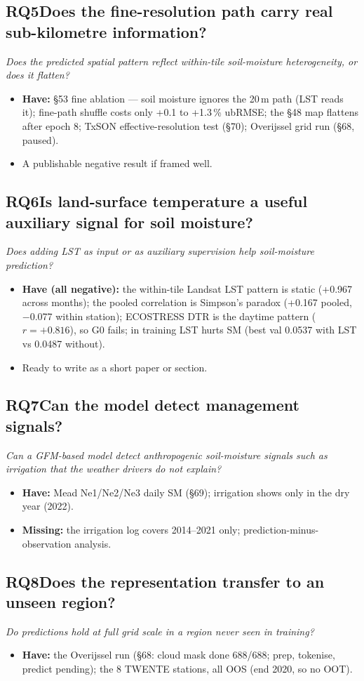 \documentclass[11pt,a4paper]{article}
\newcommand{\rqhead}[2]{\subsection*{#1\quad #2}}
\begin{document}
\rqhead{RQ5}{Does the fine-resolution path carry real sub-kilometre information?}
\textit{Does the predicted spatial pattern reflect within-tile soil-moisture heterogeneity, or does it flatten?}
\begin{itemize}
\item \textbf{Have:} \S53 fine ablation --- soil moisture ignores the 20\,m path (LST reads it);
      fine-path shuffle costs only +0.1 to +1.3\,\% ubRMSE; the \S48 map flattens after epoch 8;
      TxSON effective-resolution test (\S70); Overijssel grid run (\S68, paused).
\item A publishable negative result if framed well.
\end{itemize}

\rqhead{RQ6}{Is land-surface temperature a useful auxiliary signal for soil moisture?}
\textit{Does adding LST as input or as auxiliary supervision help soil-moisture prediction?}
\begin{itemize}
\item \textbf{Have (all negative):} the within-tile Landsat LST pattern is static (+0.967 across
      months); the pooled correlation is Simpson's paradox (+0.167 pooled, $-$0.077 within station);
      ECOSTRESS DTR is the daytime pattern ($r=+0.816$), so G0 fails; in training LST hurts SM
      (best val 0.0537 with LST vs 0.0487 without).
\item Ready to write as a short paper or section.
\end{itemize}

\rqhead{RQ7}{Can the model detect management signals?}
\textit{Can a GFM-based model detect anthropogenic soil-moisture signals such as irrigation that the
weather drivers do not explain?}
\begin{itemize}
\item \textbf{Have:} Mead Ne1/Ne2/Ne3 daily SM (\S69); irrigation shows only in the dry year (2022).
\item \textbf{Missing:} the irrigation log covers 2014--2021 only; prediction-minus-observation analysis.
\end{itemize}

\rqhead{RQ8}{Does the representation transfer to an unseen region?}
\textit{Do predictions hold at full grid scale in a region never seen in training?}
\begin{itemize}
\item \textbf{Have:} the Overijssel run (\S68: cloud mask done 688/688; prep, tokenise, predict pending);
      the 8 TWENTE stations, all OOS (end 2020, so no OOT).
\end{itemize}
\end{document}
